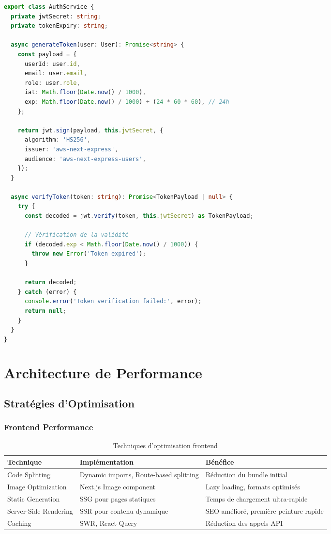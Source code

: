 \begin{lstlisting}[language=TypeScript, caption=Service d'authentification]
export class AuthService {
  private jwtSecret: string;
  private tokenExpiry: string;

  async generateToken(user: User): Promise<string> {
    const payload = {
      userId: user.id,
      email: user.email,
      role: user.role,
      iat: Math.floor(Date.now() / 1000),
      exp: Math.floor(Date.now() / 1000) + (24 * 60 * 60), // 24h
    };

    return jwt.sign(payload, this.jwtSecret, {
      algorithm: 'HS256',
      issuer: 'aws-next-express',
      audience: 'aws-next-express-users',
    });
  }

  async verifyToken(token: string): Promise<TokenPayload | null> {
    try {
      const decoded = jwt.verify(token, this.jwtSecret) as TokenPayload;
      
      // Vérification de la validité
      if (decoded.exp < Math.floor(Date.now() / 1000)) {
        throw new Error('Token expired');
      }

      return decoded;
    } catch (error) {
      console.error('Token verification failed:', error);
      return null;
    }
  }
}
\end{lstlisting}

\section{Architecture de Performance}

\subsection{Stratégies d'Optimisation}

\subsubsection{Frontend Performance}

\begin{table}[H]
    \centering
    \begin{tabularx}{\textwidth}{|X|X|X|}
        \hline
        \textbf{Technique} & \textbf{Implémentation} & \textbf{Bénéfice} \\
        \hline
        Code Splitting & Dynamic imports, Route-based splitting & Réduction du bundle initial \\
        \hline
        Image Optimization & Next.js Image component & Lazy loading, formats optimisés \\
        \hline
        Static Generation & SSG pour pages statiques & Temps de chargement ultra-rapide \\
        \hline
        Server-Side Rendering & SSR pour contenu dynamique & SEO amélioré, première peinture rapide \\
        \hline
        Caching & SWR, React Query & Réduction des appels API \\
        \hline
    \end{tabularx}
    \caption{Techniques d'optimisation frontend}
    \label{tab:frontend_optimization}
\end{table}

